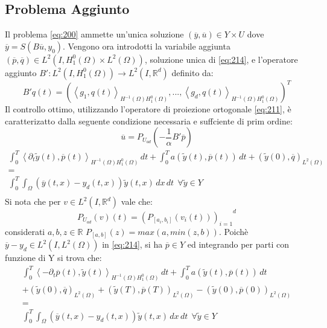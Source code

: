 \subsection{Problema Aggiunto}
Il problema \ref{eq:200} ammette un'unica soluzione $(\overline{y},\overline{u}){\in}Y{\times}U$ dove $\overline{y}=S(B\overline{u},y_0)$.
Vengono ora introdotti la variabile aggiunta $(\overline{p},\overline{q}) \in L^2(I,{H^{0}_{1}(\Omega)}{\times}{L^{2}(\Omega)})$, soluzione unica di \ref{eq:214}, e l'operatore aggiunto $B':L^2(I,{H^{0}_{1}(\Omega)}){\rightarrow}L^2(I,\mathbb{R}^d)$ definito da:
\begin{equation}
B'q(t) = ( \left \langle g_1,q(t) \right \rangle_{{H^{-1}(\Omega)}{H^{0}_{1}(\Omega)}}, . . . ,\left \langle g_d,q(t) \right \rangle_{{H^{-1}(\Omega)}{H^{0}_{1}(\Omega)}})^T
\label{eq:212}
\end{equation}
Il controllo ottimo, utilizzando l'operatore di proiezione ortogonale \ref{eq:211}, è caratterizatto dalla seguente condizione necessaria e suffciente di prim ordine:
\begin{equation}
\overline{u}=P_{U_{ad}}\left( -\frac{1}{\alpha}B'\overline{p} \right)
\label{eq:213}
\end{equation}
\begin{equation}
\begin{array}{c}
	\int_{0}^{T} \left \langle {\partial_{t}}\tilde{y}(t),\overline{p}(t) \right \rangle_{{H^{-1}(\Omega)}{H^{0}_{1}(\Omega)}} \, dt +  	\int_{0}^{T} a(\tilde{y}(t),\overline{p}(t)) \, dt + (\tilde{y}(0),\overline{q})_{L^{2}(\Omega)}  \\
	 = \\
	\int_{0}^{T} \int_{\Omega} (\overline{y}(t,x)-y_d(t,x))\tilde{y}(t,x) \,dx \, dt  \ \ \forall \tilde{y} \in Y \\
\end{array}
\label{eq:214}
\end{equation}
Si nota che per $v \in L^2(I,\mathbb{R}^d)$ vale che:
\begin{equation}
P_{U_{ad}}(v)(t) = {(P_{[a_i,b_i]}(v_i(t)))_{i=1}}^d
\label{eq:215}
\end{equation}
considerati $a,b,z \in \mathbb{R}$ $P_{[a,b]}(z) = max(a,min(z,b))$.
Poichè $\overline{y} - y_d \in L^2(I,{L^{2}(\Omega)})$ in \ref{eq:214}, si ha $\overline{p} \in Y$ ed integrando per parti con funzione di Y si trova che:
{\renewcommand\arraystretch{2}
\begin{equation}
\begin{array}{c}
	\int_{0}^{T} \left \langle -{\partial_{t}}\overline{p}(t),\tilde{y}(t) \right \rangle_{{H^{-1}(\Omega)}{H^{0}_{1}(\Omega)}} \, dt +  	\int_{0}^{T} a(\tilde{y}(t),\overline{p}(t)) \, dt \\
	+ (\tilde{y}(0),\overline{q})_{L^{2}(\Omega)} + (\tilde{y}(T),\overline{p}(T))_{L^{2}(\Omega)} - (\tilde{y}(0),\overline{p}(0))_{L^{2}(\Omega)} \\
	 = \\
	\int_{0}^{T} \int_{\Omega} (\overline{y}(t,x)-y_d(t,x))\tilde{y}(t,x) \,dx \, dt  \ \ \forall \tilde{y} \in Y \\
\end{array}
\label{eq:216}
\end{equation}
} %
